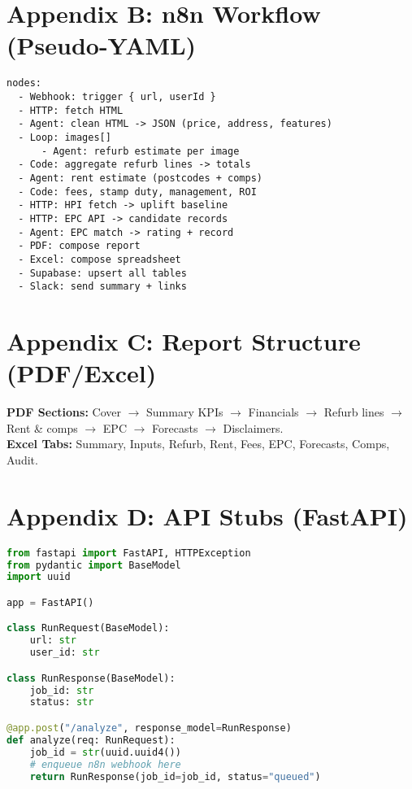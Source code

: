 \documentclass[12pt,a4paper]{article}
\begin{document}
\section*{Appendix B: n8n Workflow (Pseudo-YAML)}
\begin{lstlisting}
nodes:
  - Webhook: trigger { url, userId }
  - HTTP: fetch HTML
  - Agent: clean HTML -> JSON (price, address, features)
  - Loop: images[]
      - Agent: refurb estimate per image
  - Code: aggregate refurb lines -> totals
  - Agent: rent estimate (postcodes + comps)
  - Code: fees, stamp duty, management, ROI
  - HTTP: HPI fetch -> uplift baseline
  - HTTP: EPC API -> candidate records
  - Agent: EPC match -> rating + record
  - PDF: compose report
  - Excel: compose spreadsheet
  - Supabase: upsert all tables
  - Slack: send summary + links
\end{lstlisting}

\section*{Appendix C: Report Structure (PDF/Excel)}
\textbf{PDF Sections:} Cover $\rightarrow$ Summary KPIs $\rightarrow$ Financials $\rightarrow$ Refurb lines $\rightarrow$ Rent \& comps $\rightarrow$ EPC $\rightarrow$ Forecasts $\rightarrow$ Disclaimers. \\
\textbf{Excel Tabs:} Summary, Inputs, Refurb, Rent, Fees, EPC, Forecasts, Comps, Audit.

\section*{Appendix D: API Stubs (FastAPI)}
\begin{lstlisting}[language=Python]
from fastapi import FastAPI, HTTPException
from pydantic import BaseModel
import uuid

app = FastAPI()

class RunRequest(BaseModel):
    url: str
    user_id: str

class RunResponse(BaseModel):
    job_id: str
    status: str

@app.post("/analyze", response_model=RunResponse)
def analyze(req: RunRequest):
    job_id = str(uuid.uuid4())
    # enqueue n8n webhook here
    return RunResponse(job_id=job_id, status="queued")
\end{lstlisting}
\end{document}
